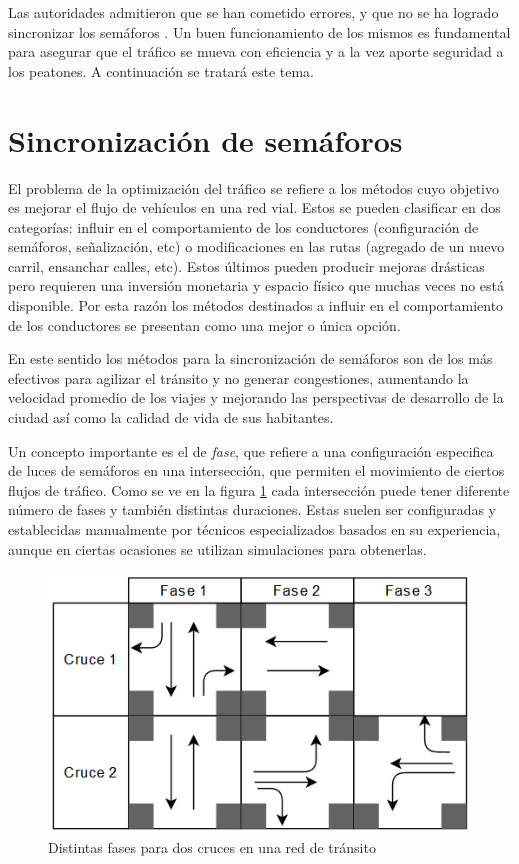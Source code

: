 Las autoridades admitieron que se han cometido errores, y que no se ha logrado sincronizar los semáforos \citep{olivera2013}. Un buen funcionamiento de los mismos es fundamental para asegurar que el tráfico se mueva con eficiencia y a la vez aporte seguridad a los peatones. A continuación se tratará este tema. 


\section{Sincronización de semáforos}
El problema de la optimización del tráfico se refiere a los métodos cuyo objetivo es mejorar el flujo de vehículos en una red vial. Estos se pueden clasificar en dos categorías: influir en el comportamiento de los conductores (configuración de semáforos, señalización, etc) o modificaciones en las rutas (agregado de un nuevo carril, ensanchar calles, etc). 
Estos últimos pueden producir mejoras drásticas pero requieren una inversión monetaria y espacio físico que muchas veces no está disponible. Por esta razón los métodos destinados a influir en el comportamiento de los conductores se presentan como una mejor o única opción.

En este sentido los métodos para la sincronización de semáforos son de los más efectivos para agilizar el tránsito y no generar congestiones, aumentando la velocidad promedio de los viajes y mejorando las perspectivas de desarrollo de la ciudad así como la calidad de vida de sus habitantes. 

Un concepto importante es el de \emph{fase}, que refiere a una configuración especifica de luces de semáforos en una intersección, que permiten el movimiento de ciertos flujos de tráfico. Como se ve en la figura \ref{fig:fases} cada intersección puede tener diferente número de fases y también distintas duraciones. Estas suelen ser configuradas y establecidas manualmente por técnicos especializados basados en su experiencia, aunque en ciertas ocasiones se utilizan simulaciones para obtenerlas. 

\begin{figure}[H]
	\centering
	\includegraphics[width=0.8\linewidth]{Figures/fases1}
	\caption{Distintas fases para dos cruces en una red de tránsito}
	\label{fig:fases}
\end{figure}

